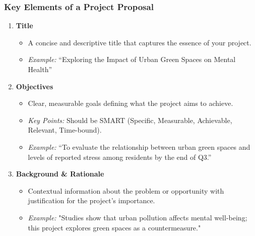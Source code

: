\documentclass[aspectratio=169]{beamer}
\begin{document}
\begin{frame}[fragile]
    \frametitle{Key Elements of a Project Proposal}
    \begin{enumerate}
        \item \textbf{Title}
            \begin{itemize}
                \item A concise and descriptive title that captures the essence of your project.
                \item \textit{Example:} “Exploring the Impact of Urban Green Spaces on Mental Health”
            \end{itemize}
        
        \item \textbf{Objectives}
            \begin{itemize}
                \item Clear, measurable goals defining what the project aims to achieve. 
                \item \textit{Key Points:} Should be SMART (Specific, Measurable, Achievable, Relevant, Time-bound).
                \item \textit{Example:} “To evaluate the relationship between urban green spaces and levels of reported stress among residents by the end of Q3.”
            \end{itemize}
        
        \item \textbf{Background \& Rationale}
            \begin{itemize}
                \item Contextual information about the problem or opportunity with justification for the project’s importance.
                \item \textit{Example:} "Studies show that urban pollution affects mental well-being; this project explores green spaces as a countermeasure."
            \end{itemize}
    \end{enumerate}
\end{frame}
\end{document}
